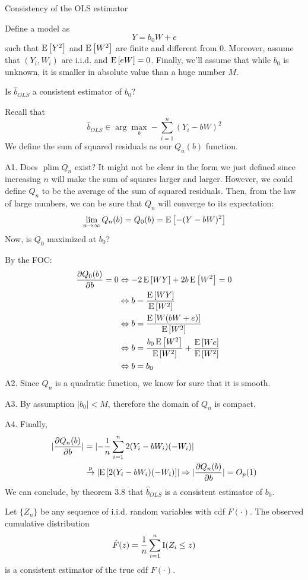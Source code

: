 \begin{bclogo}[couleur=blue!10, arrondi=0.1, logo=,ombre=false]{ Consistency of the OLS estimator} 
\begin{small}
Define a model as $$Y = b_0W + e$$ such that $\operatorname{E}\left[Y^2\right]$ and $\operatorname{E}\left[W^2\right]$ are finite and different from $0$. Moreover, assume that $(Y_i,W_i)$ are i.i.d. and $\operatorname{E}\left[eW\right]=0$. Finally, we'll assume that while $b_0$ is unknown, it is smaller in absolute value than a huge number $M$.

Is $\hat b_{OLS}$ a consistent estimator of $b_0$?

Recall that $$\hat b_{OLS} \in \operatorname{arg}\max_b -\sum_{i=1}^{n} (Y_i - bW)^2 $$ We define the sum of squared residuals as our $Q_n(b)$ function.

A1. Does $\operatorname{plim}Q_n$ exist? It might not be clear in the form we just defined since increasing $n$ will make the sum of squares larger and larger. However, we could define $Q_n$ to be the average of the sum of squared residuals. Then, from the law of large numbers, we can be sure that $Q_n$ will converge to its expectation: $$\lim_{n\to\infty} Q_n(b) = Q_0(b) = \operatorname{E}\left[-(Y - bW)^2\right]$$ Now, is $Q_0$ maximized at $b_0$?

By the FOC: \begin{align*}
\frac{\partial Q_0(b)}{\partial b} = 0 & \Leftrightarrow -2\operatorname{E}\left[WY\right] + 2b\operatorname{E}\left[W^2\right] = 0 \\
& \Leftrightarrow  b = \frac{\operatorname{E}\left[WY\right]}{\operatorname{E}\left[W^2\right]} \\
& \Leftrightarrow  b = \frac{\operatorname{E}\left[W(bW+e)\right]}{\operatorname{E}\left[W^2\right]} \\
& \Leftrightarrow  b = \frac{b_0\operatorname{E}\left[W^2\right]}{\operatorname{E}\left[W^2\right]} + \frac{\operatorname{E}\left[We\right]}{\operatorname{E}\left[W^2\right]} \\
& \Leftrightarrow  b = b_0\\
\end{align*}
A2. Since $Q_n$ is a quadratic function, we know for sure that it is smooth.

A3. By assumption $\lvert b_0\rvert < M$, therefore the domain of $Q_n$ is compact.

A4. Finally, \begin{align*}
\lvert \frac{\partial Q_n(b)}{\partial b} \rvert & = \lvert -\frac{1}{n} \sum_{i=1}^{n} 2(Y_i - bW_i)(-W_i)\rvert \\
& \overset{\text{p}}{\to} \lvert\operatorname{E}\left[2(Y_i - bW_i)(-W_i)\right]\rvert \Rightarrow \lvert \frac{\partial Q_n(b)}{\partial b} \rvert = O_p(1)
\end{align*}
We can conclude, by theorem 3.8 that $\hat b_{OLS}$ is a consistent estimator of $b_0$.
\end{small}
\end{bclogo}

\begin{theorem}
Let $\{ Z_n\}$ be any sequence of i.i.d. random variables with cdf $F(\cdot)$. The observed cumulative distribution $$\hat F(z) = \frac{1}{n} \sum_{i=1}^{n}\operatorname{I}(Z_i \leq z)$$ is a consistent estimator of the true cdf $F(\cdot)$.
\end{theorem}